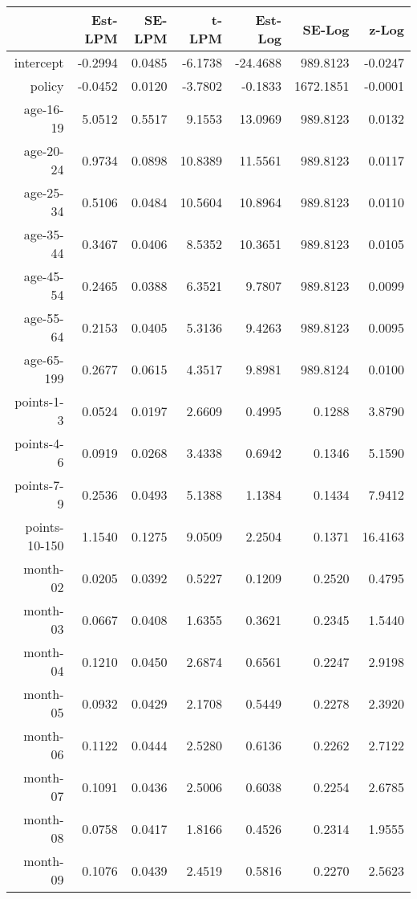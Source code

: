 \documentclass[10pt]{article}
\begin{document}
\begin{table}[ht]
\centering
\begin{tabular}{rrrrrrr}
  \hline
 & Est-LPM & SE-LPM & t-LPM & Est-Log & SE-Log & z-Log \\ 
  \hline
intercept & -0.2994 & 0.0485 & -6.1738 & -24.4688 & 989.8123 & -0.0247 \\ 
  policy & -0.0452 & 0.0120 & -3.7802 & -0.1833 & 1672.1851 & -0.0001 \\ 
  age-16-19 & 5.0512 & 0.5517 & 9.1553 & 13.0969 & 989.8123 & 0.0132 \\ 
  age-20-24 & 0.9734 & 0.0898 & 10.8389 & 11.5561 & 989.8123 & 0.0117 \\ 
  age-25-34 & 0.5106 & 0.0484 & 10.5604 & 10.8964 & 989.8123 & 0.0110 \\ 
  age-35-44 & 0.3467 & 0.0406 & 8.5352 & 10.3651 & 989.8123 & 0.0105 \\ 
  age-45-54 & 0.2465 & 0.0388 & 6.3521 & 9.7807 & 989.8123 & 0.0099 \\ 
  age-55-64 & 0.2153 & 0.0405 & 5.3136 & 9.4263 & 989.8123 & 0.0095 \\ 
  age-65-199 & 0.2677 & 0.0615 & 4.3517 & 9.8981 & 989.8124 & 0.0100 \\ 
  points-1-3 & 0.0524 & 0.0197 & 2.6609 & 0.4995 & 0.1288 & 3.8790 \\ 
  points-4-6 & 0.0919 & 0.0268 & 3.4338 & 0.6942 & 0.1346 & 5.1590 \\ 
  points-7-9 & 0.2536 & 0.0493 & 5.1388 & 1.1384 & 0.1434 & 7.9412 \\ 
  points-10-150 & 1.1540 & 0.1275 & 9.0509 & 2.2504 & 0.1371 & 16.4163 \\ 
  month-02 & 0.0205 & 0.0392 & 0.5227 & 0.1209 & 0.2520 & 0.4795 \\ 
  month-03 & 0.0667 & 0.0408 & 1.6355 & 0.3621 & 0.2345 & 1.5440 \\ 
  month-04 & 0.1210 & 0.0450 & 2.6874 & 0.6561 & 0.2247 & 2.9198 \\ 
  month-05 & 0.0932 & 0.0429 & 2.1708 & 0.5449 & 0.2278 & 2.3920 \\ 
  month-06 & 0.1122 & 0.0444 & 2.5280 & 0.6136 & 0.2262 & 2.7122 \\ 
  month-07 & 0.1091 & 0.0436 & 2.5006 & 0.6038 & 0.2254 & 2.6785 \\ 
  month-08 & 0.0758 & 0.0417 & 1.8166 & 0.4526 & 0.2314 & 1.9555 \\ 
  month-09 & 0.1076 & 0.0439 & 2.4519 & 0.5816 & 0.2270 & 2.5623 \\ 

\end{tabular}
\end{table}
\end{document}
